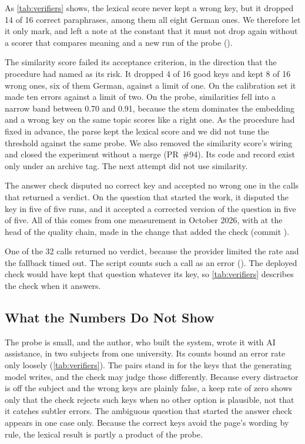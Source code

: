 As \cref{tab:verifiers} shows, the lexical score never kept a wrong key, but
it dropped 14 of 16 correct paraphrases, among them all eight German ones. We
therefore let it only mark, and left a note at the constant that it must not
drop again without a scorer that compares meaning and a new run of the probe
().

The similarity score failed its acceptance criterion, in the direction that
the procedure had named as its risk. It dropped 4 of 16 good keys and kept 8
of 16 wrong ones, six of them German, against a limit of one. On the
calibration set it made ten errors against a limit of two. On the probe,
similarities fell into a narrow band between 0.70 and 0.91, because the stem
dominates the embedding and a wrong key on the same topic scores like a right
one. As the procedure had fixed in advance, the parse kept the lexical score and
we did not tune the threshold against the same probe. We also removed the
similarity score's wiring and closed the experiment without a merge (PR~\#94). Its code and record exist only under an
archive tag. The next attempt did not use similarity.

The answer check disputed no correct key and accepted no wrong one in the
calls that returned a verdict. On the question that started the work, it
disputed the key in five of five runs, and it accepted a corrected version of
the question in five of five. All of this comes from one measurement in
October 2026, with  at the head of the quality chain, made
in the change that added the check (commit ).

One of the 32 calls returned no verdict, because the provider limited the rate
and the fallback timed out. The script counts such a call as an error
().
The deployed check would have kept that question whatever its key, so
\cref{tab:verifiers} describes the check when it answers.

\subsection{What the Numbers Do Not Show}
\label{sec:c6-threats}

The probe is small, and the author, who built the system, wrote it with AI
assistance, in two subjects from one university. Its counts bound an error
rate only loosely (\cref{tab:verifiers}). The pairs stand in for the keys that the generating model
writes, and the check may judge those differently. Because every distractor is
off the subject and the wrong keys are plainly false, a keep rate of zero
shows only that the check rejects such keys when no other option is
plausible, not that it catches subtler errors. The ambiguous question that
started the answer check appears in one case only. Because the correct keys
avoid the page's wording by rule, the lexical result is partly a product of
the probe.


